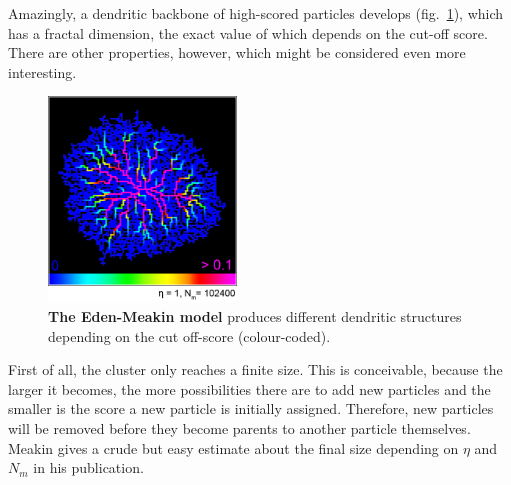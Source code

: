 \documentclass[twocolumn, 10pt]{scrartcl}
\begin{document}
        Amazingly, a dendritic backbone of high-scored particles develops (fig.~\ref{fig-eden}), which has a
        fractal dimension,
        the exact value of which depends on the cut-off score. There are other properties, however, which
        might be considered even more interesting.
        \begin{figure}
            \center
            \includegraphics[width=5cm]{img/eden.png}
            \caption[The Eden-Meakin model]
                {\small\textbf{The Eden-Meakin model} produces different dendritic structures depending on the
                cut off-score (colour-coded).}
            \label{fig-eden}
        \end{figure}

        First of all, the cluster only reaches a finite size. This is conceivable, because the larger it
        becomes, the more possibilities there are to add new particles and the smaller is the score a new
        particle is initially assigned. Therefore, new particles will be removed before they become parents
        to another particle themselves. Meakin gives a crude but easy estimate about the final size depending on
        $\eta$ and $N_m$ in his publication.
\end{document}
